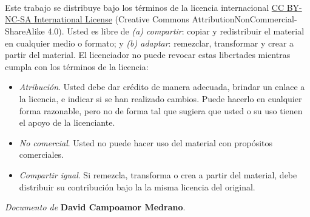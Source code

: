 \

\

\

\noindent
Este trabajo se distribuye bajo los términos de la licencia internacional \href{http://creativecommons.org/licenses/by-nc-sa/4.0/}{CC BY-NC-SA International License} (Creative Commons AttributionNonCommercial-ShareAlike 4.0). Usted es libre de \textit{(a) compartir}: copiar y redistribuir el material en cualquier medio o formato; y \textit{(b) adaptar}: remezclar, transformar y crear a partir del material. El licenciador no puede revocar estas libertades mientras cumpla con los términos de la licencia:

\begin{itemize}
\item \textit{Atribución}. Usted debe dar crédito de manera adecuada, brindar un enlace a la licencia, e indicar si se han realizado cambios. Puede hacerlo en cualquier forma razonable, pero no de forma tal que sugiera que usted o su uso tienen el apoyo de la licenciante.
\item \textit{No comercial}. Usted no puede hacer uso del material con propósitos comerciales.
\item \textit{Compartir igual}. Si remezcla, transforma o crea a partir del material, debe distribuir su contribución bajo la la misma licencia del original.
\end{itemize}

\begin{flushright}
		\vspace{7.0 cm}
		\emph{Documento de} \textbf{David Campoamor Medrano}. %
\end{flushright}


